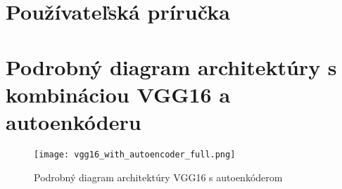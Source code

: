 \section{Používateľská príručka}

\newpage
{}
\section{Podrobný diagram architektúry s kombináciou VGG16 a autoenkóderu}
\label{vgg16_autoencoder_architecture_detailed}
\begin{figure}[H]
	\begin{center}
		\texttt{[image: vgg16\_with\_autoencoder\_full.png]}
		\caption[Podrobný diagram architektúry VGG16 s autoenkóderom]{Podrobný diagram architektúry VGG16 s autoenkóderom}
	\end{center}
\end{figure}



